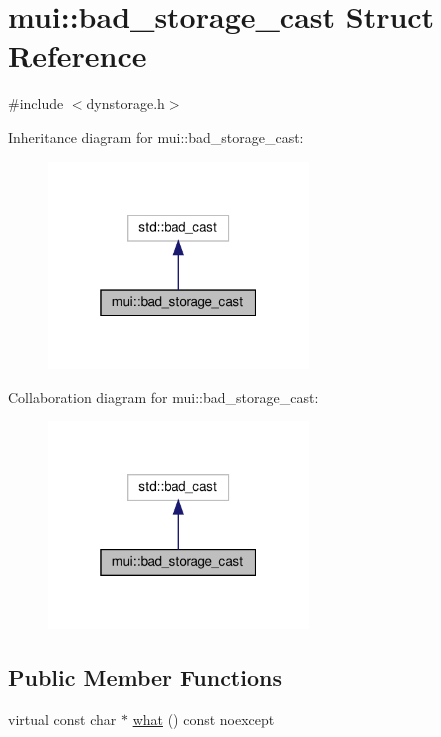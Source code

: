 \hypertarget{structmui_1_1bad__storage__cast}{}\section{mui\+:\+:bad\+\_\+storage\+\_\+cast Struct Reference}
\label{structmui_1_1bad__storage__cast}


{\ttfamily \#include $<$dynstorage.\+h$>$}



Inheritance diagram for mui\+:\+:bad\+\_\+storage\+\_\+cast\+:
\nopagebreak
\begin{figure}[H]
\begin{center}
\leavevmode
\includegraphics[width=196pt]{structmui_1_1bad__storage__cast__inherit__graph}
\end{center}
\end{figure}


Collaboration diagram for mui\+:\+:bad\+\_\+storage\+\_\+cast\+:
\nopagebreak
\begin{figure}[H]
\begin{center}
\leavevmode
\includegraphics[width=196pt]{structmui_1_1bad__storage__cast__coll__graph}
\end{center}
\end{figure}
\subsection*{Public Member Functions}
\begin{DoxyCompactItemize}
\item 
virtual const char $\ast$ \hyperlink{structmui_1_1bad__storage__cast_a052cbf41469ca194b4f423ea523f0071}{what} () const noexcept
\end{DoxyCompactItemize}



